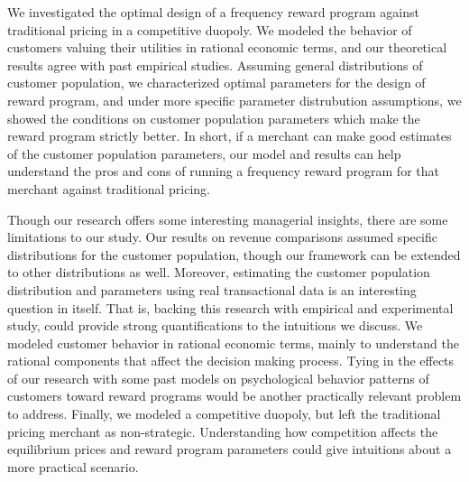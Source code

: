 We investigated the optimal design of a frequency reward program against traditional pricing in a competitive duopoly.
We modeled the behavior of customers valuing their utilities in rational economic terms, and our theoretical results agree with past empirical studies.
Assuming general distributions of customer population, we characterized optimal parameters for the design of reward program, and under more specific parameter distrubution assumptions, we showed the conditions on customer population parameters which make the reward program strictly better.
In short, if a merchant can make good estimates of the customer population parameters, our model and results can help understand the pros and cons of running a frequency reward program for that merchant against traditional pricing.

Though our research offers some interesting managerial insights, there are some limitations to our study. 
Our results on revenue comparisons assumed specific distributions for the customer population, though our framework can be extended to other distributions as well. Moreover, estimating the customer population distribution and parameters using real transactional data is an interesting question in itself.
That is, backing this research with empirical and experimental study, could provide strong quantifications to the intuitions we discuss.
We modeled customer behavior in rational economic terms, mainly to understand the rational components that affect the decision making process.
Tying in the effects of our research with some past models on psychological behavior patterns of customers toward reward programs would be another practically relevant problem to address.
Finally, we modeled a competitive duopoly, but left the traditional pricing merchant as non-strategic.
Understanding how competition affects the equilibrium prices and reward program parameters could give intuitions about a more practical scenario. 
